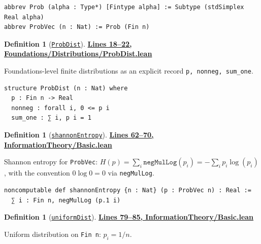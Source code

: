 \documentclass[11pt]{article}
\theoremstyle{definition}
\newtheorem{definition}[theorem]{Definition}
\theoremstyle{remark}
\begin{document}
\begin{lstlisting}[caption={Mathlib-grounded finite distributions (stdSimplex)}]
abbrev Prob (alpha : Type*) [Fintype alpha] := Subtype (stdSimplex Real alpha)
abbrev ProbVec (n : Nat) := Prob (Fin n)
\end{lstlisting}

\begin{definition}[\href{https://github.com/zariuq/ks-foundations-of-inference/blob/main/ProbabilityTheory/Foundations/Distributions/ProbDist.lean\#L19}{\texttt{ProbDist}}]
\textbf{\href{https://github.com/zariuq/ks-foundations-of-inference/blob/main/ProbabilityTheory/Foundations/Distributions/ProbDist.lean\#L18-L22}{Lines 18--22, Foundations/Distributions/ProbDist.lean}}

Foundations-level finite distributions as an explicit record \texttt{p, nonneg, sum\_one}.
\end{definition}

\begin{lstlisting}[caption={Foundations-level finite distributions (record form)}]
structure ProbDist (n : Nat) where
  p : Fin n -> Real
  nonneg : forall i, 0 <= p i
  sum_one : ∑ i, p i = 1
\end{lstlisting}

\begin{definition}[\href{https://github.com/zariuq/ks-foundations-of-inference/blob/main/InformationTheory/Basic.lean\#L68}{\texttt{shannonEntropy}}]
\textbf{\href{https://github.com/zariuq/ks-foundations-of-inference/blob/main/InformationTheory/Basic.lean\#L62-L70}{Lines 62--70, InformationTheory/Basic.lean}}

Shannon entropy for \texttt{ProbVec}: $H(p) = \sum_i \texttt{negMulLog}(p_i) = -\sum_i p_i \log(p_i)$,
with the convention $0 \log 0 = 0$ via \texttt{negMulLog}.
\end{definition}

\begin{lstlisting}[caption={Shannon entropy on ProbVec}]
noncomputable def shannonEntropy {n : Nat} (p : ProbVec n) : Real :=
  ∑ i : Fin n, negMulLog (p.1 i)
\end{lstlisting}

\begin{definition}[\href{https://github.com/zariuq/ks-foundations-of-inference/blob/main/InformationTheory/Basic.lean\#L80}{\texttt{uniformDist}}]
\textbf{\href{https://github.com/zariuq/ks-foundations-of-inference/blob/main/InformationTheory/Basic.lean\#L79-L85}{Lines 79--85, InformationTheory/Basic.lean}}

Uniform distribution on \texttt{Fin n}: $p_i = 1/n$.
\end{definition}
\end{document}
